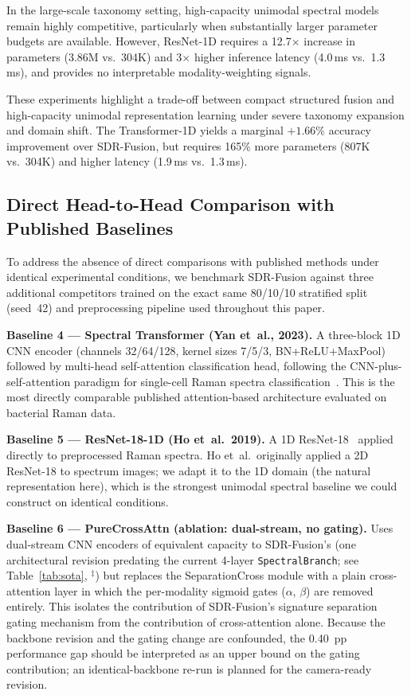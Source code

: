 \documentclass[preprint,12pt]{elsarticle}
\begin{document}
In the large-scale taxonomy setting, high-capacity unimodal spectral
models remain highly competitive, particularly when substantially
larger parameter budgets are available. However, ResNet-1D requires a 12.7$\times$ increase in parameters
(3.86M vs.\ 304K) and 3$\times$ higher inference latency (4.0\,ms
vs.\ 1.3\,ms), and provides no interpretable modality-weighting
signals.

These experiments highlight a trade-off between compact structured
fusion and high-capacity unimodal representation learning under severe
taxonomy expansion and domain shift. The Transformer-1D yields a marginal
$+1.66$\% accuracy improvement over SDR-Fusion, but requires 165\% more
parameters (807K vs.\ 304K) and higher latency (1.9\,ms vs.\ 1.3\,ms).

\subsection{Direct Head-to-Head Comparison with Published Baselines}
\label{ssec:sota}

To address the absence of direct comparisons with published methods
under identical experimental conditions, we benchmark SDR-Fusion against
three additional competitors trained on the exact same 80/10/10
stratified split (seed~42) and preprocessing pipeline used throughout
this paper.

\textbf{Baseline 4 — Spectral Transformer (Yan et~al., 2023).}
A three-block 1D CNN encoder (channels 32/64/128, kernel sizes 7/5/3,
BN+ReLU+MaxPool) followed by multi-head self-attention classification head,
following the CNN-plus-self-attention paradigm for single-cell Raman spectra
classification~\cite{yan2023spectral}. This is the most directly comparable
published attention-based architecture evaluated on bacterial Raman data.

\textbf{Baseline 5 — ResNet-18-1D (Ho et~al.\ 2019).}
A 1D ResNet-18~\cite{ho2019rapid,he2016deep} applied directly to
preprocessed Raman spectra. Ho et~al.\ originally applied a 2D
ResNet-18 to spectrum images; we adapt it to the 1D domain (the
natural representation here), which is the strongest unimodal
spectral baseline we could construct on identical conditions.

\textbf{Baseline 6 — PureCrossAttn (ablation: dual-stream, no gating).}
Uses dual-stream CNN encoders of equivalent capacity to SDR-Fusion's
(one architectural revision predating the current 4-layer
\texttt{SpectralBranch}; see Table~\ref{tab:sota}, $^\ddagger$) but
replaces the SeparationCross module with a plain cross-attention layer
in which the per-modality sigmoid gates ($\alpha$, $\beta$) are
removed entirely. This isolates the contribution of SDR-Fusion's
signature separation gating mechanism from the contribution of
cross-attention alone. Because the backbone revision and the gating
change are confounded, the 0.40~pp performance gap should be
interpreted as an upper bound on the gating contribution; an
identical-backbone re-run is planned for the camera-ready revision.
\end{document}
